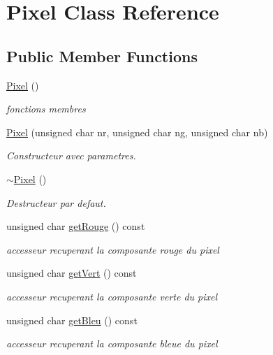 \hypertarget{classPixel}{}\section{Pixel Class Reference}
\label{classPixel}
\subsection*{Public Member Functions}
\begin{DoxyCompactItemize}
\item 
\mbox{\hyperlink{classPixel_a27ad99a2f705e635c42d242d530d4756}{Pixel}} ()
\begin{DoxyCompactList}\small\item\em fonctions membres \end{DoxyCompactList}\item 
\mbox{\hyperlink{classPixel_ae14440155731c2f7e2073b7bbbd596f3}{Pixel}} (unsigned char nr, unsigned char ng, unsigned char nb)
\begin{DoxyCompactList}\small\item\em Constructeur avec parametres. \end{DoxyCompactList}\item 
\mbox{\label{classPixel_a30f6aaf9a1d8792245070860546fa365}} 
\mbox{\hyperlink{classPixel_a30f6aaf9a1d8792245070860546fa365}{$\sim$\+Pixel}} ()
\begin{DoxyCompactList}\small\item\em Destructeur par defaut. \end{DoxyCompactList}\item 
unsigned char \mbox{\hyperlink{classPixel_ab0ec14a265184c9452407394a29b65d2}{get\+Rouge}} () const
\begin{DoxyCompactList}\small\item\em accesseur recuperant la composante rouge du pixel \end{DoxyCompactList}\item 
unsigned char \mbox{\hyperlink{classPixel_a35afebd6965ea07c3d3c9a4c46176676}{get\+Vert}} () const
\begin{DoxyCompactList}\small\item\em accesseur recuperant la composante verte du pixel \end{DoxyCompactList}\item 
unsigned char \mbox{\hyperlink{classPixel_aa3e3cf7f2ca814ae2cfeb84cd48f3268}{get\+Bleu}} () const
\begin{DoxyCompactList}\small\item\em accesseur recuperant la composante bleue du pixel \end{DoxyCompactList}\item 

\end{DoxyCompactItemize}

